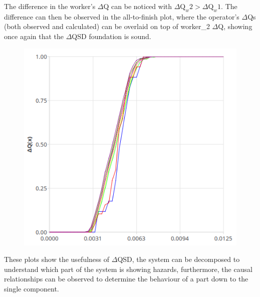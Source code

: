             The difference in the worker's $\Delta$Q can be noticed with $\Delta \text{Q}_w2 > \Delta \text{Q}_w1$. The difference can then be observed in the all-to-finish plot, where the operator's $\Delta$Qs (both observed and calculated) can be overlaid on top of worker\_2 $\Delta$Q, showing once again that the $\Delta$QSD foundation is sound.

            \begin{figure}[H]
                \begin{center}
                    \includegraphics[scale = 0.5]{img/atfw1w2.png}
                \end{center}
            \end{figure}

    These plots show the usefulness of $\Delta$QSD, the system can be decomposed to understand which part of the system is showing hazards, furthermore, the causal relationships can be observed to determine the behaviour of a part down to the single component.
